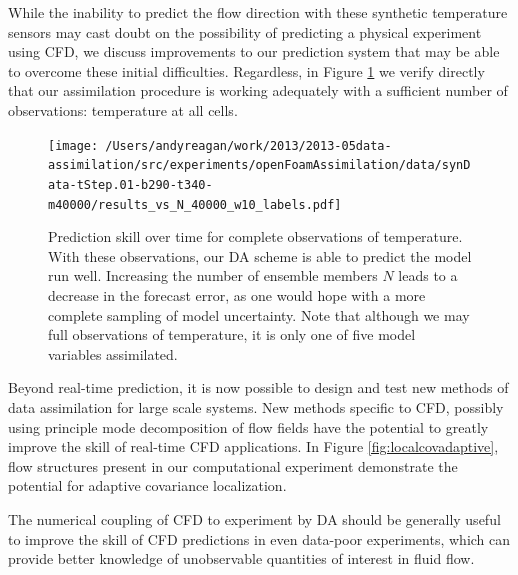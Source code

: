 While the inability to predict the flow direction with these synthetic temperature sensors may cast doubt on the possibility of predicting a physical experiment using CFD, we discuss improvements to our prediction system that may be able to overcome these initial difficulties.
Regardless, in Figure \ref{fig:fullObsExp} we verify directly that our assimilation procedure is working adequately with a sufficient number of observations: temperature at all cells.

\begin{figure}[h!]
  \centering
  \texttt{[image: /Users/andyreagan/work/2013/2013-05data-assimilation/src/experiments/openFoamAssimilation/data/synData-tStep.01-b290-t340-m40000/results\_vs\_N\_40000\_w10\_labels.pdf]}
  \caption[Prediction skill over time for complete observations of temperature]{
    Prediction skill over time for complete observations of temperature.
    With these observations, our DA scheme is able to predict the model run well.
    Increasing the number of ensemble members $N$ leads to a decrease in the forecast error, as one would hope with a more complete sampling of model uncertainty.
    Note that although we may full observations of temperature, it is only one of five model variables assimilated.
  }
  \label{fig:fullObsExp}
\end{figure}

Beyond real-time prediction, it is now possible to design and test new methods of data assimilation for large scale systems.
New methods specific to CFD, possibly using principle mode decomposition of flow fields have the potential to greatly improve the skill of real-time CFD applications.
In Figure \ref{fig:localcovadaptive}, flow structures present in our computational experiment demonstrate the potential for adaptive covariance localization.

The numerical coupling of CFD to experiment by DA should be generally useful to improve the skill of CFD predictions in even data-poor experiments, which can provide better knowledge of unobservable quantities of interest in fluid flow.


